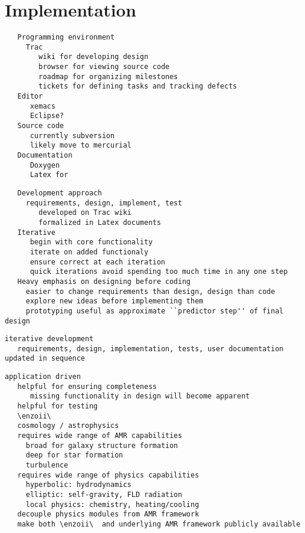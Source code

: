 \documentclass{article}
\begin{document}
\section{Implementation} \label{s:implementation}


\begin{verbatim}
   Programming environment
     Trac
        wiki for developing design
        browser for viewing source code
        roadmap for organizing milestones
        tickets for defining tasks and tracking defects
   Editor
      xemacs
      Eclipse?
   Source code     
      currently subversion
      likely move to mercurial
   Documentation
      Doxygen
      Latex for 
\end{verbatim}

\begin{verbatim}
   Development approach
     requirements, design, implement, test
        developed on Trac wiki
        formalized in Latex documents
   Iterative
      begin with core functionality
      iterate on added functionaly
      ensure correct at each iteration
      quick iterations avoid spending too much time in any one step
   Heavy emphasis on designing before coding
     easier to change requirements than design, design than code
     explore new ideas before implementing them
     prototyping useful as approximate ``predictor step'' of final design
\end{verbatim}
\begin{verbatim}
iterative development
   requirements, design, implementation, tests, user documentation updated in sequence
\end{verbatim}



\begin{verbatim}
application driven
   helpful for ensuring completeness
      missing functionality in design will become apparent
   helpful for testing
   \enzoii\ 
   cosmology / astrophysics
   requires wide range of AMR capabilities
     broad for galaxy structure formation
     deep for star formation
     turbulence
   requires wide range of physics capabilities
     hyperbolic: hydrodynamics
     elliptic: self-gravity, FLD radiation
     local physics: chemistry, heating/cooling
   decouple physics modules from AMR framework
   make both \enzoii\  and underlying AMR framework publicly available
\end{verbatim}
\end{document}
